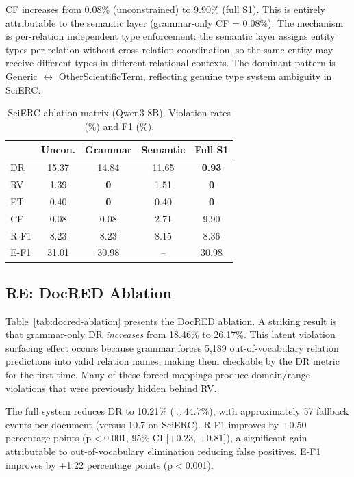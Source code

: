 \documentclass[11pt,a4paper]{article}
\newcommand{\drsym}{\textsc{DR}}
\newcommand{\rvsym}{\textsc{RV}}
\newcommand{\etsym}{\textsc{ET}}
\newcommand{\cfsym}{\textsc{CF}}
\begin{document}
\cfsym{} increases from 0.08\% (unconstrained) to 9.90\% (full S1). This is entirely attributable to the semantic layer (grammar-only \cfsym{} = 0.08\%). The mechanism is per-relation independent type enforcement: the semantic layer assigns entity types per-relation without cross-relation coordination, so the same entity may receive different types in different relational contexts. The dominant pattern is Generic $\leftrightarrow$ OtherScientificTerm, reflecting genuine type system ambiguity in SciERC.

\begin{table}[t]
\centering
\caption{SciERC ablation matrix (Qwen3-8B). Violation rates (\%) and F1 (\%).}
\label{tab:scierc-ablation}
\small
\begin{tabular}{lcccc}
\toprule
& \textbf{Uncon.} & \textbf{Grammar} & \textbf{Semantic} & \textbf{Full S1} \\
\midrule
\drsym{} & 15.37 & 14.84 & 11.65 & \textbf{0.93} \\
\rvsym{} & 1.39 & \textbf{0} & 1.51 & \textbf{0} \\
\etsym{} & 0.40 & \textbf{0} & 0.40 & \textbf{0} \\
\cfsym{} & 0.08 & 0.08 & 2.71 & 9.90 \\
\midrule
R-F1 & 8.23 & 8.23 & 8.15 & 8.36 \\
E-F1 & 31.01 & 30.98 & -- & 30.98 \\
\bottomrule
\end{tabular}
\end{table}

\subsection{RE: DocRED Ablation}
\label{sec:docred-ablation}

Table~\ref{tab:docred-ablation} presents the DocRED ablation. A striking result is that grammar-only \drsym{} \textit{increases} from 18.46\% to 26.17\%. This latent violation surfacing effect occurs because grammar forces 5,189 out-of-vocabulary relation predictions into valid relation names, making them checkable by the \drsym{} metric for the first time. Many of these forced mappings produce domain/range violations that were previously hidden behind \rvsym{}.

The full system reduces \drsym{} to 10.21\% ($\downarrow$44.7\%), with approximately 57 fallback events per document (versus 10.7 on SciERC). R-F1 improves by +0.50 percentage points (p$<$0.001, 95\% CI [+0.23, +0.81]), a significant gain attributable to out-of-vocabulary elimination reducing false positives. E-F1 improves by +1.22 percentage points (p$<$0.001).
\end{document}
